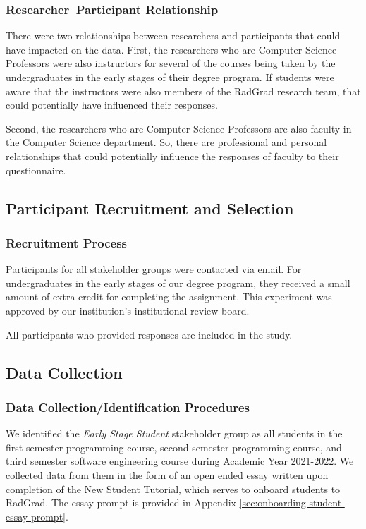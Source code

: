 \documentclass[acmsmall]{acmart}
\begin{document}
\subsubsection{Researcher–Participant Relationship}

There were two relationships between researchers and participants that could have impacted on the data. First, the researchers who are Computer Science Professors were also instructors for several of the courses being taken by the undergraduates in the early stages of their degree program. If students were aware that the instructors were also members of the RadGrad research team, that could potentially have influenced their responses.

Second, the researchers who are Computer Science Professors are also faculty in the Computer Science department. So, there are professional and personal relationships that could potentially influence the responses of faculty to their questionnaire.

\subsection{Participant Recruitment and Selection}
\subsubsection{Recruitment Process}

Participants for all stakeholder groups were contacted via email.  For undergraduates in the early stages of our degree program, they received a small amount of extra credit for completing the assignment.  This experiment was approved by our institution's institutional review board.

All participants who provided responses are included in the study.

\subsection{Data Collection}

\subsubsection{Data Collection/Identification Procedures}

We identified the {\em Early Stage Student} stakeholder group as all students in the first semester programming course, second semester programming course, and third semester software engineering course during Academic Year 2021-2022. We collected data from them in the form of an open ended essay written upon completion of the New Student Tutorial, which serves to onboard students to RadGrad. The essay prompt is provided in Appendix \ref{sec:onboarding-student-essay-prompt}.
\end{document}
